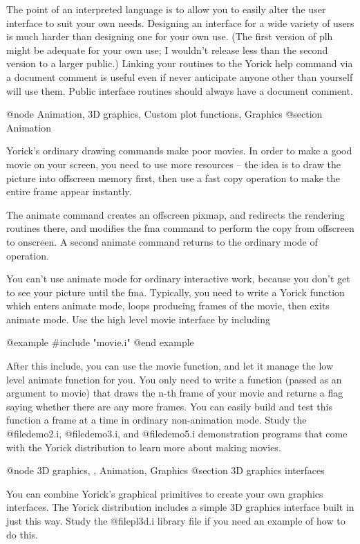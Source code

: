 The point of an interpreted language is to allow you to easily alter
the user interface to suit your own needs.  Designing an interface for
a wide variety of users is much harder than designing one for your own
use.  (The first version of plh might be adequate for your own use; I
wouldn't release less than the second version to a larger public.)
Linking your routines to the Yorick help command via a document
comment is useful even if never anticipate anyone other than yourself
will use them.  Public interface routines should always have a
document comment.

@node Animation, 3D graphics, Custom plot functions, Graphics
@section Animation

Yorick's ordinary drawing commands make poor movies.  In order to make
a good movie on your screen, you need to use more resources -- the
idea is to draw the picture into offscreen memory first, then use a
fast copy operation to make the entire frame appear instantly.

The animate command creates an offscreen pixmap, and redirects the
rendering routines there, and modifies the fma command to perform the
copy from offscreen to onscreen.  A second animate command returns to
the ordinary mode of operation.

You can't use animate mode for ordinary interactive work, because you
don't get to see your picture until the fma.  Typically, you need to
write a Yorick function which enters animate mode, loops producing
frames of the movie, then exits animate mode.  Use the high level
movie interface by including

@example
#include "movie.i"
@end example

After this include, you can use the movie function, and let it manage
the low level animate function for you.  You only need to write a
function (passed as an argument to movie) that draws the n-th frame of
your movie and returns a flag saying whether there are any more frames.
You can easily build and test this function a frame at a time in
ordinary non-animation mode.  Study the @file{demo2.i}, @file{demo3.i},
and @file{demo5.i} demonstration programs that come with the Yorick
distribution to learn more about making movies.

@node 3D graphics,  , Animation, Graphics
@section 3D graphics interfaces

You can combine Yorick's graphical primitives to create your own
graphics interfaces.  The Yorick distribution includes a simple 3D
graphics interface built in just this way.  Study the @file{pl3d.i} library
file if you need an example of how to do this.

